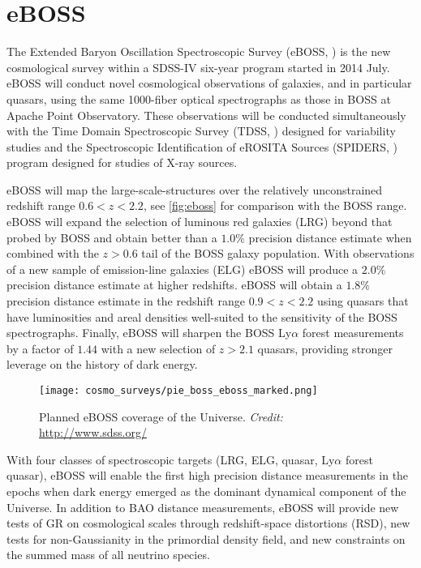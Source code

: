 \section{eBOSS}
The Extended Baryon Oscillation Spectroscopic Survey (eBOSS, \cite{2016AJ....151...44D}) is the new cosmological survey within a SDSS-IV six-year program started in 2014 July. eBOSS will conduct novel cosmological observations of galaxies, and in particular quasars, using the same 1000-fiber optical spectrographs as those in BOSS at Apache Point Observatory. These observations will be conducted simultaneously with the Time Domain Spectroscopic Survey (TDSS, \cite{2015ApJ...806..244M}) designed for variability studies and the Spectroscopic Identification of eROSITA Sources (SPIDERS, \cite{2010SPIE.7741E..1NF}) program designed for studies of X-ray sources.

eBOSS will map the large-scale-structures over the relatively unconstrained redshift range $0.6<z< 2.2$, see \autoref{fig:eboss} for comparison with the BOSS range. eBOSS will expand the selection of luminous red galaxies (LRG) beyond that probed by BOSS and obtain better than a $1.0\%$ precision distance estimate when combined with the $z > 0.6$ tail of the BOSS galaxy population. With observations of a new sample of emission-line galaxies (ELG) eBOSS will produce a $2.0\%$ precision distance estimate at higher redshifts. eBOSS will obtain a $1.8\%$ precision distance estimate in the redshift range $0.9 < z < 2.2$ using quasars that have luminosities and areal densities well-suited to the sensitivity of the BOSS spectrographs. Finally, eBOSS will sharpen the BOSS Ly$\alpha$ forest measurements by a factor of $1.44$ with a new selection of $z > 2.1$ quasars, providing stronger leverage on the history of dark energy.
\begin{figure}[htb]
    \centering
    \texttt{[image: cosmo\_surveys/pie\_boss\_eboss\_marked.png]}
    \caption{Planned eBOSS coverage of the Universe. \textit{Credit:} \url{http://www.sdss.org/}}
    \label{fig:eboss}
\end{figure}

With four classes of spectroscopic targets (LRG, ELG, quasar, Ly$\alpha$ forest quasar), eBOSS will enable the first high precision distance measurements in the epochs when dark energy emerged as the dominant dynamical component of the Universe. In addition to BAO distance measurements, eBOSS will provide new tests of GR on cosmological scales through redshift-space distortions (RSD), new tests for non-Gaussianity in the primordial density field, and new constraints on the summed mass of all neutrino species.
